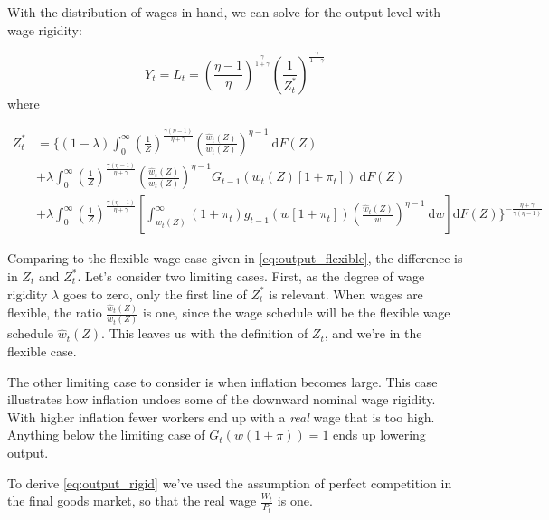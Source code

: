 \documentclass[12pt,a4paper]{scrartcl}            %
\begin{document}
With the distribution of wages in hand, we can solve for the output level with wage rigidity:

\begin{equation}
    \label{eq:output_rigid}
    Y_t = L_t = \left(\frac{\eta - 1}{\eta} \right)^{\frac{\gamma}{1 + \gamma}}\left( \frac{1}{Z_t^*} \right)^{\frac{\gamma}{1 + \gamma}}
\end{equation}
%
where

\begin{equation}
    \label{eq:z_star}
    \begin{split}
    Z_t^* &= \Big\{(1 - \lambda) \int_{0}^{\infty} \! \left( \frac{1}{Z} \right)^{\frac{\gamma(\eta - 1)}{\eta + \gamma}} \left( \frac{\hat{w}_t(Z)}{w_t(Z)} \right)^{\eta - 1}\ \mathrm{d}F(Z) \\
          &+            \lambda  \int_{0}^{\infty} \! \left( \frac{1}{Z} \right)^{\frac{\gamma(\eta - 1)}{\eta + \gamma}} \left( \frac{\hat{w}_t(Z)}{w_t(Z)} \right)^{\eta - 1} G_{t-1}\left( w_t(Z)[1 + \pi_t] \right)                                                     \ \mathrm{d}F(Z)\\
          &+            \lambda  \int_{0}^{\infty} \! \left( \frac{1}{Z} \right)^{\frac{\gamma(\eta - 1)}{\eta + \gamma}} \left[ \int_{w_t(Z)}^{\infty} (1 + \pi_t)g_{t-1}\left( w[1 + \pi_t] \right) \left( \frac{\hat{w}_t(Z)}{w} \right)^{\eta - 1}\ \mathrm{d}w \right] \mathrm{d}F(Z)
            \Big\}^{-\frac{\eta + \gamma}{\gamma(\eta - 1)}}
    \end{split}
\end{equation}

Comparing to the flexible-wage case given in \eqref{eq:output_flexible}, the difference is in $Z_t$ and $Z_t^*$.
Let's consider two limiting cases.
First, as the degree of wage rigidity $\lambda$ goes to zero, only the first line of $Z_t^*$ is relevant.
When wages are flexible, the ratio $\frac{\hat{w}_t(Z)}{w_t(Z)}$ is one, since the wage schedule will be the flexible wage schedule $\hat{w}_t(Z)$.  %
This leaves us with the definition of $Z_t$, and we're in the flexible case.

The other limiting case to consider is when inflation becomes large.
This case illustrates how inflation undoes some of the downward nominal wage rigidity.
With higher inflation fewer workers end up with a \emph{real} wage that is too high.
Anything below the limiting case of $G_t(w (1 + \pi)) = 1$ ends up lowering output.  %

To derive \eqref{eq:output_rigid} we've used the assumption of perfect competition in the final goods market, so that the real wage $\frac{W_t}{P_t}$ is one.
\end{document}
